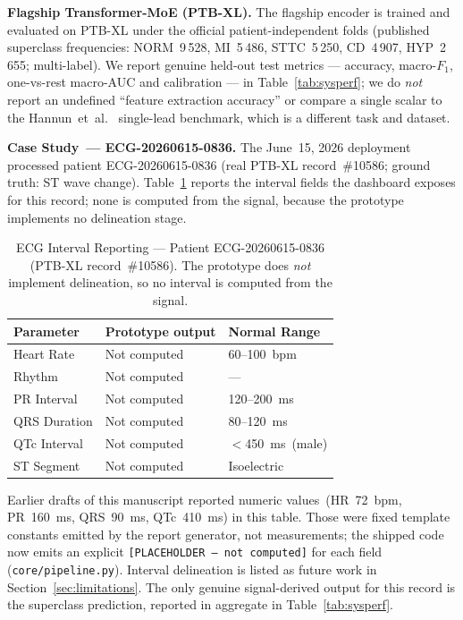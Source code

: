 \documentclass[AMA,STIX1COL,]{WileyNJD-v2}
\begin{document}
\noindent\textbf{Flagship Transformer-MoE (PTB-XL).}
The flagship encoder is trained and evaluated on PTB-XL under the
official patient-independent folds (published superclass frequencies:
NORM~9\,528, MI~5\,486, STTC~5\,250, CD~4\,907, HYP~2\,655;
multi-label). We report genuine held-out test metrics --- accuracy,
macro-$F_1$, one-vs-rest macro-AUC and calibration --- in
Table~\ref{tab:sysperf}; we do \emph{not} report an undefined
``feature extraction accuracy'' or compare a single scalar to the
Hannun~et~al.~\cite{hannun2019} single-lead benchmark, which is a
different task and dataset.

\noindent\textbf{Case Study~--- ECG-20260615-0836.}
The June~15, 2026 deployment processed patient ECG-20260615-0836
(real PTB-XL record~\#10586; ground truth: ST wave change).
Table~\ref{tab:ecgparams} reports the interval fields the dashboard
exposes for this record; none is computed from the signal, because the
prototype implements no delineation stage.

\begin{table}[!t]
\caption{ECG Interval Reporting --- Patient ECG-20260615-0836
(PTB-XL record~\#10586). The prototype does \emph{not} implement
delineation, so no interval is computed from the signal.}
\label{tab:ecgparams}
\centering
\renewcommand{\arraystretch}{1.1}
\begin{tabular}{lll}
\toprule
\textbf{Parameter} & \textbf{Prototype output} & \textbf{Normal Range}\\
\midrule
Heart Rate   & Not computed & 60--100~bpm\\
Rhythm       & Not computed & ---\\
PR Interval  & Not computed & 120--200~ms\\
QRS Duration & Not computed & 80--120~ms\\
QTc Interval & Not computed & $<$450~ms~(male)\\
ST Segment   & Not computed & Isoelectric\\
\bottomrule
\end{tabular}
\end{table}

Earlier drafts of this manuscript reported numeric values~(HR~72~bpm,
PR~160~ms, QRS~90~ms, QTc~410~ms) in this table. Those were fixed
template constants emitted by the report generator, not measurements;
the shipped code now emits an explicit
\texttt{[PLACEHOLDER --- not computed]} for each field
(\texttt{core/pipeline.py}). Interval delineation is listed as future
work in Section~\ref{sec:limitations}. The only genuine signal-derived
output for this record is the superclass prediction, reported in
aggregate in Table~\ref{tab:sysperf}.
\end{document}

